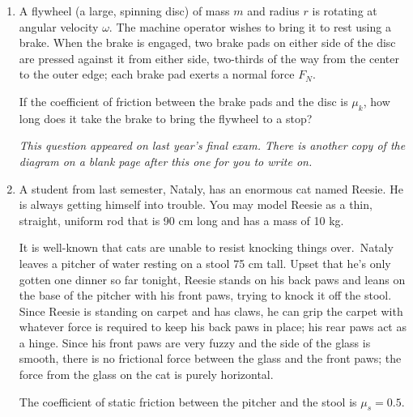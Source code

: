 \documentclass[12pt]{article}
\begin{document}
\Large
\centerline{}
\normalsize
\centerline{}

\begin{enumerate}

\item A flywheel (a large, spinning disc) of mass $m$ and radius $r$ is rotating
at angular velocity $\omega$. The machine operator wishes to bring it to rest using a brake. When the brake 
is engaged, two brake pads on either side of the disc are pressed against it from either side, two-thirds
of the way from the center to the outer edge; each brake pad
exerts a normal force $F_N$. 

If the coefficient of friction between the brake pads and the disc is $\mu_k$, how long does it take the
brake to bring the flywheel to a stop?


\newpage

\begin{center} \it This question appeared on last year's final exam. There is another copy of the diagram on a blank page after this one for you to write on.\end{center}

\item A student from last semester, Nataly, has an enormous cat named Reesie. He is always getting himself into trouble. You may model Reesie as a thin, straight, uniform rod that is 90 cm long and has a mass of 10 kg.

\begin{minipage}{0.6\textwidth}
	It is well-known that cats are unable to resist knocking things over.\footnotemark~Nataly leaves a pitcher of water resting on a stool 75 cm tall. Upset that he's only gotten
	one dinner so far tonight, Reesie
	stands on his back paws and leans on the base of the pitcher with his front paws, trying to knock it off the stool. Since Reesie is standing on carpet and has claws, he can grip the carpet with whatever force is required to keep his back paws in place; his rear paws act as a hinge. Since his front paws are very fuzzy and the side of the glass is smooth, there is no frictional force between the glass and the front paws; the force from the glass on the cat is purely horizontal.
	
	\bigskip
	
	The coefficient of static friction between the pitcher and the stool is $\mu_s = 0.5$.
	
	\bigskip
	\bigskip
	

\end{minipage}
\end{enumerate}
\end{document}
